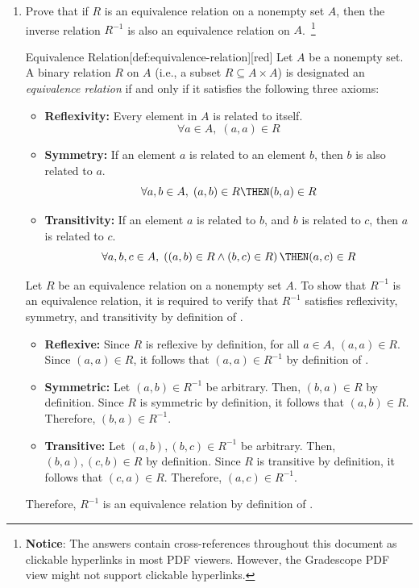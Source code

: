 \begin{enumerate}
  \item Prove that if $R$ is an equivalence relation on a nonempty set $A$, then 
  the inverse relation $R^{-1}$ is also an equivalence relation on $A$.~\footnote{
    \textbf{Notice}: The answers contain cross-references throughout this document as clickable hyperlinks in most PDF viewers. 
    However, the Gradescope PDF view might not support clickable hyperlinks.
  }

  \begin{define}{Equivalence Relation}[def:equivalence-relation][red]
    Let $A$ be a nonempty set. A binary relation $R$ on $A$ (i.e., a subset $R \subseteq A \times A$) is designated an \emph{equivalence relation} if and only if it satisfies the following three axioms:
    \begin{itemize}
      \item[\textbf{1.}] \textbf{Reflexivity:} Every element in $A$ is related to itself.
        $$ \forall a \in A, \; (a,a) \in R $$
      \item[\textbf{2.}] \textbf{Symmetry:} If an element $a$ is related to an element $b$, then $b$ is also related to $a$.
        $$ \forall a,b \in A, \; (a,b) \in R \THEN (b,a) \in R $$
      \item[\textbf{3.}] \textbf{Transitivity:} If an element $a$ is related to $b$, and $b$ is related to $c$, then $a$ is related to $c$.
        $$ \forall a,b,c \in A, \; \left( (a,b) \in R \land (b,c) \in R \right) \THEN (a,c) \in R $$
    \end{itemize}
  \end{define}
  \begin{subprove}
    Let $R$ be an equivalence relation on a nonempty set $A$. 
    To show that $R^{-1}$ is an equivalence relation, it is required to verify that $R^{-1}$ satisfies reflexivity, symmetry, and transitivity by definition of .
    \begin{itemize}
      \item \textbf{Reflexive:} Since $R$ is reflexive by definition, for all $a \in A$, $(a,a) \in R$. 
      Since $(a,a) \in R$, it follows that $(a,a) \in R^{-1}$ by definition of .
      \item \textbf{Symmetric:} Let $(a,b) \in R^{-1}$ be arbitrary. Then, $(b,a) \in R$ by definition. 
      Since $R$ is symmetric by definition, it follows that $(a,b) \in R$. 
      Therefore, $(b,a) \in R^{-1}$.
      \item \textbf{Transitive:} Let $(a,b), (b,c) \in R^{-1}$ be arbitrary. Then, $(b,a), (c,b) \in R$ by definition. 
      Since $R$ is transitive by definition, it follows that $(c,a) \in R$. 
      Therefore, $(a,c) \in R^{-1}$.
    \end{itemize}
    Therefore, $R^{-1}$ is an equivalence relation by definition of .
  \end{subprove}






\end{enumerate}
